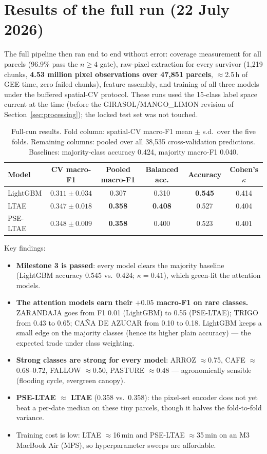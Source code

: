 \documentclass[11pt,a4paper]{article}
\begin{document}
\section{Results of the full run (22 July 2026)}
\label{sec:full}

The full pipeline then ran end to end without error: coverage measurement for all parcels
(96.9\% pass the $n\geq4$ gate), raw-pixel extraction for every survivor (1{,}219 chunks,
\textbf{4.53 million pixel observations over 47{,}851 parcels}, $\approx$2.5\,h of GEE time,
zero failed chunks), feature assembly, and training of all three models under the buffered
spatial-CV protocol. These runs used the 15-class label space current at the time (before the
GIRASOL/MANGO\_LIMON revision of Section~\ref{sec:processing}); the locked test set was not
touched.

\begin{table}[ht]
\centering\small
\caption{Full-run results. Fold column: spatial-CV macro-F1 mean $\pm$ s.d.\ over the five
folds. Remaining columns: pooled over all 38{,}535 cross-validation predictions.
Baselines: majority-class accuracy 0.424, majority macro-F1 0.040.}
\begin{tabular}{@{}lccccc@{}}
\toprule
Model & CV macro-F1 & Pooled macro-F1 & Balanced acc. & Accuracy & Cohen's $\kappa$ \\
\midrule
LightGBM & $0.311 \pm 0.034$ & 0.307 & 0.310 & \textbf{0.545} & 0.414 \\
LTAE & $0.347 \pm 0.018$ & \textbf{0.358} & \textbf{0.408} & 0.527 & 0.404 \\
PSE-LTAE & $0.348 \pm 0.009$ & \textbf{0.358} & 0.400 & 0.523 & 0.401 \\
\bottomrule
\end{tabular}
\end{table}

\noindent Key findings:
\begin{itemize}[leftmargin=1.5em]
\item \textbf{Milestone 3 is passed}: every model clears the majority baseline (LightGBM
accuracy 0.545 vs.\ 0.424; $\kappa = 0.41$), which green-lit the attention models.
\item \textbf{The attention models earn their $+0.05$ macro-F1 on rare classes.} ZARANDAJA
goes from F1 0.01 (LightGBM) to 0.55 (PSE-LTAE); TRIGO from 0.43 to 0.65; CA\~NA DE AZUCAR
from 0.10 to 0.18. LightGBM keeps a small edge on the majority classes (hence its higher
plain accuracy) --- the expected trade under class weighting.
\item \textbf{Strong classes are strong for every model}: ARROZ $\approx$0.75, CAFE
$\approx$0.68--0.72, FALLOW $\approx$0.50, PASTURE $\approx$0.48 --- agronomically sensible
(flooding cycle, evergreen canopy).
\item \textbf{PSE-LTAE $\approx$ LTAE} (0.358 vs.\ 0.358): the pixel-set encoder does not yet
beat a per-date median on these tiny parcels, though it halves the fold-to-fold variance.
\item Training cost is low: LTAE $\approx$16\,min and PSE-LTAE $\approx$35\,min on an
M3 MacBook Air (MPS), so hyperparameter sweeps are affordable.
\end{itemize}
\end{document}
